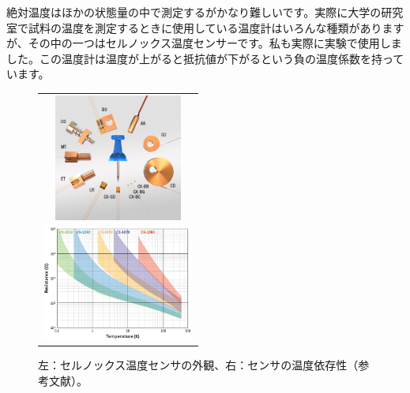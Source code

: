 \documentclass[10pt,b5paper,papersize,dvipdfmx]{jsbook}
\begin{document}
絶対温度はほかの状態量の中で測定するがかなり難しいです。実際に大学の研究室で試料の温度を測定するときに使用している温度計はいろんな種類がありますが、その中の一つはセルノックス温度センサーです。私も実際に実験で使用しました。この温度計は温度が上がると抵抗値が下がるという負の温度係数を持っています。
\begin{figure}[htbp]
  \begin{center}
      \begin{tabular}{c}
        \begin{minipage}{0.5\hsize}
            \begin{center}
            \includegraphics[clip, width=4.2cm]{img/cryotronics.png}
            \end{center}
        \end{minipage}
        \begin{minipage}{0.5\hsize}
            \begin{center}
            \includegraphics[clip, width=5cm]{img/CX-chart-1.png}
            \end{center}
        \end{minipage}
      \end{tabular}
      \caption{左：セルノックス温度センサの外観、右：センサの温度依存性（参考文献\cite{ondo}）。}
      \label{fig:cryotronics}
  \end{center}
\end{figure}
\end{document}
